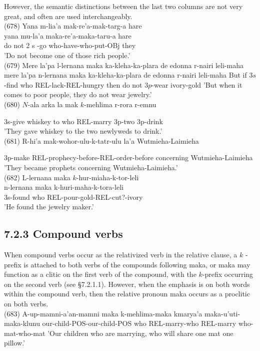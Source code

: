 \documentclass[10pt]{article}
\begin{document}
However, the semantic distinctions between the last two columns are not very great, and often are used interchangeably.\\
(678) Yana m-lia'a mak-re'a-mak-targ-a hare\\
yana mu-la'a maka-re'a-maka-taru-a hare\\
do not 2 s -go who-have-who-put-OBj they\\
'Do not become one of those rich people.'\\
(679) Mere la’pa l-lernana maka ka-kleha-ka-plara de edonna r-nairi leli-maha\\
mere la'pa n-lernana maka ka-kleha-ka-plara de edonna r-nairi leli-maha But if \(3 s\)-find who REL-lack-REL-hungry then do not \(3 p\)-wear ivory-gold 'But when it comes to poor people, they do not wear jewelry.'\\
(680) \(N\)-ala arka la mak \(k\)-mehlima r-rora r-emnu

3s-give whiskey to who REL-marry 3p-two 3p-drink\\
'They gave whiskey to the two newlyweds to drink.'\\
(681) R-hi'a mak-wohor-ulu-k-tatr-ulu la'a Wutmieha-Laimieha

3p-make REL-prophecy-before-REL-order-before concerning Wutmieha-Laimieha 'They became prophets concerning Wutmieha-Laimieha.'\\
(682) L-lernana maka \(k\)-hur-miaha-k-tor-leli\\
n-lernana maka k-huri-maha-k-tora-leli\\
3s-found who REL-pour-gold-REL-cut?-ivory\\
'He found the jewelry maker.'

\subsection*{7.2.3 Compound verbs}
When compound verbs occur as the relativized verb in the relative clause, a \(k\) - prefix is attached to both verbs of the compounds following maka, or maka may function as a clitic on the first verb of the compound, with the \(k\)-prefix occurring on the second verb (see §7.2.1.1). However, when the emphasis is on both words within the compound verb, then the relative pronoun maka occurs as a proclitic on both verbs.\\
(683) A-up-mamni-a'an-mamni maka k-mehlima-maka kmarya'a maka-u'uti-maka-klunu our-child-POS-our-child-POS who REL-marry-who REL-marry who-mat-who-mat 'Our children who are marrying, who will share one mat one pillow.'
\end{document}
